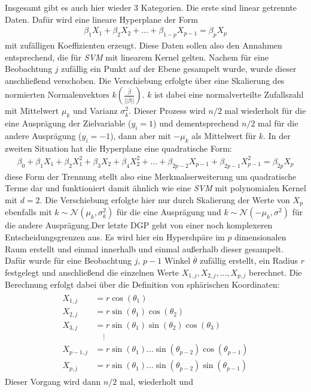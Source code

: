 \documentclass[
]{article}
\begin{document}
Insgesamt gibt es auch hier wieder 3 Kategorien. Die erste sind linear
getrennte Daten. Dafür wird eine lineare Hyperplane der Form
\begin{align}
\beta_1 X_1+\beta_2 X_2 +...+\beta_{1-p} X_{p-1}= \beta_p X_p
\end{align} mit zufälligen Koeffizienten erzeugt. Diese Daten sollen
also den Annahmen entsprechend, die für \textit{SVM} mit linearem Kernel
gelten. Nachem für eine Beobachtung \(j\) zufällig ein Punkt auf der
Ebene gesampelt wurde, wurde dieser anschließend verschoben. Die
Verschiebung erfolgte über eine Skalierung des normierten
Normalenvektors
\(k\left(\frac{\overline{\beta}}{||\overline{\beta}||}\right)\). \(k\)
ist dabei eine normalverteilte Zufallszahl mit Mittelwert \(\mu_k\) und
Varianz \(\sigma^2_k\). Dieser Prozess wird \(n/2\) mal wiederholt für
die eine Ausprägung der Zielvariable (\(y_i=1\)) und dementsprechend
\(n/2\) mal für die andere Ausprägung (\(y_i=-1\)), dann aber mit
\(-\mu_k\) als Mittelwert für \(k\). \newline In der zweiten Situation
hat die Hyperplane eine quadratische Form: \begin{align}
\beta_0+\beta_1 X_1 + \beta_2 X_1^2+\beta_3 X_2+\beta_4 X_2^2+...+\beta_{2p-2}X_{p-1}+\beta_{2p-1}X_{p-1}^2=\beta_{2p} X_p
\end{align} diese Form der Trennung stellt also eine Merkmalserweiterung
um quadratische Terme dar und funktioniert damit ähnlich wie eine
\textit{SVM} mit polynomialen Kernel mit \(d=2\). Die Verschiebung
erfolgte hier nur durch Skalierung der Werte von \(X_p\) ebenfalls mit
\(k\sim\mathcal{N}(\mu_k,\sigma^2_k)\) für die eine Ausprägung und
\(k\sim\mathcal{N}(-\mu_k,\sigma^2)\) für die andere
Ausprägung.\newline  Der letzte DGP geht von einer noch komplexeren
Entscheidungsgrenzen aus. Es wird hier ein Hypershpäre im \(p\)
dimensionalen Raum erstellt und einmal innerhalb und einmal außerhalb
dieser gesampelt. Dafür wurde für eine Beobachtung \(j\), \(p-1\) Winkel
\(\overline{\theta}\) zufällig erstellt, ein Radius \(r\) festgelegt und
anschließend die einzelnen Werte \(X_{1,j},X_{2,j},...,X_{p,j}\)
berechnet. Die Berechnung erfolgt dabei über die Definition von
sphärischen Koordinaten: \begin{align}
\begin{aligned}
        X_{1,j} &= r \cos(\theta_1)\\
        X_{2,j} &= r \sin(\theta_1)\cos(\theta_2)\\
        X_{3,j} &= r \sin(\theta_1)\sin(\theta_2)\cos(\theta_3)\\
        &\quad \vdots\\
        X_{p-1,j}&=r \sin(\theta_1)\ldots \sin(\theta_{p-2})\cos(\theta_{p-1})\\
        X_{p,j}&=r \sin(\theta_1)\ldots \sin(\theta_{p-2})\sin(\theta_{p-1})
    \end{aligned}
    \end{align} Dieser Vorgang wird dann \(n/2\) mal, wiederholt und
\end{document}

